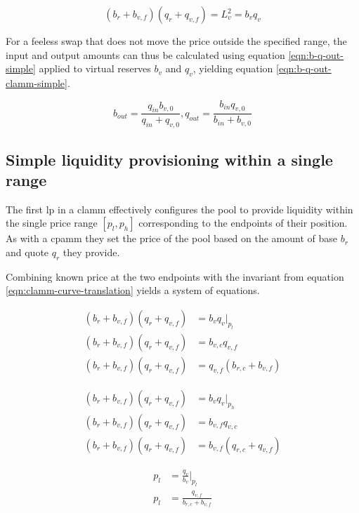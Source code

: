 \documentclass[table, twocolumn]{article}
\begin{document}
\begin{equation} \label{eqn:clamm-curve-translation}
  (b_r + b_{v, f})(q_r + q_{v, f}) = L_v^2 = b_v q_v
\end{equation}

For a feeless swap that does not move the price outside the specified range, the input
and output amounts can thus be calculated using equation \ref{eqn:b-q-out-simple}
applied to virtual reserves $b_v$ and $q_v$, yielding equation
\ref{eqn:b-q-out-clamm-simple}.

\begin{equation} \label{eqn:b-q-out-clamm-simple}
  b_{out} = \frac{q_{in} b_{v, 0}}{q_{in} + q_{v, 0}},
  q_{out} = \frac{b_{in} q_{v, 0}}{b_{in} + b_{v, 0}}
\end{equation}

\subsection{Simple liquidity provisioning within a single range}

The first \gls{lp} in a \gls{clamm} effectively configures the pool to provide liquidity
within the single price range $[p_l, p_h]$ corresponding to the endpoints of their
position. As with a \gls{cpamm} they set the price of the pool based on the amount of
base $b_r$ and quote $q_r$ they provide.

Combining known price at the two endpoints with the invariant from equation
\ref{eqn:clamm-curve-translation} yields a system of equations.

\begin{align} \label{eqn:sys-a}
  (b_r + b_{v, f})(q_r + q_{v, f}) &= b_v q_v |_{p_l} \nonumber \\
  (b_r + b_{v, f})(q_r + q_{v, f}) &= b_{v, c} q_{v, f} \nonumber \\
  (b_r + b_{v, f})(q_r + q_{v, f}) &= q_{v, f} (b_{r, c} + b_{v, f})
\end{align}

\begin{align} \label{eqn:sys-b}
  (b_r + b_{v, f})(q_r + q_{v, f}) &= b_v q_v |_{p_h} \nonumber \\
  (b_r + b_{v, f})(q_r + q_{v, f}) &= b_{v, f} q_{v, c} \nonumber \\
  (b_r + b_{v, f})(q_r + q_{v, f}) &= b_{v, f} (q_{r, c} + q_{v, f})
\end{align}

\begin{align} \label{eqn:sys-c}
  p_l &= \frac{q_v}{b_v}|_{p_l} \nonumber \\
  p_l &= \frac{q_{v, f}}{b_{r, c} + {b_{v, f}}}
\end{align}
\end{document}
